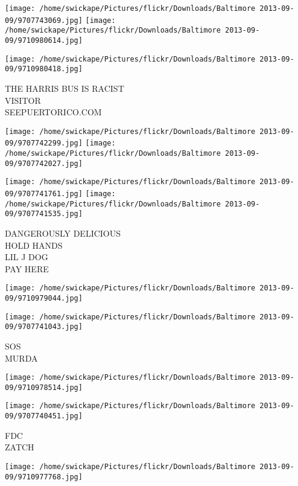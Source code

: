 \documentclass[10pt,letterpaper]{article}
\begin{document}
\texttt{[image: /home/swickape/Pictures/flickr/Downloads/Baltimore 2013-09-09/9707743069.jpg]}
\texttt{[image: /home/swickape/Pictures/flickr/Downloads/Baltimore 2013-09-09/9710980614.jpg]}

\vspace{0.25in}
\texttt{[image: /home/swickape/Pictures/flickr/Downloads/Baltimore 2013-09-09/9710980418.jpg]}

THE HARRIS BUS IS RACIST\\
VISITOR\\
SEEPUERTORICO.COM\\
\pagebreak

\texttt{[image: /home/swickape/Pictures/flickr/Downloads/Baltimore 2013-09-09/9707742299.jpg]}
\texttt{[image: /home/swickape/Pictures/flickr/Downloads/Baltimore 2013-09-09/9707742027.jpg]}

\texttt{[image: /home/swickape/Pictures/flickr/Downloads/Baltimore 2013-09-09/9707741761.jpg]}
\texttt{[image: /home/swickape/Pictures/flickr/Downloads/Baltimore 2013-09-09/9707741535.jpg]}

DANGEROUSLY DELICIOUS\\
HOLD HANDS\\
LIL J DOG\\
PAY HERE\\
\pagebreak

\texttt{[image: /home/swickape/Pictures/flickr/Downloads/Baltimore 2013-09-09/9710979044.jpg]}

\vspace{0.25in}
\texttt{[image: /home/swickape/Pictures/flickr/Downloads/Baltimore 2013-09-09/9707741043.jpg]}

SOS\\
MURDA\\
\pagebreak

\texttt{[image: /home/swickape/Pictures/flickr/Downloads/Baltimore 2013-09-09/9710978514.jpg]}

\vspace{0.25in}
\texttt{[image: /home/swickape/Pictures/flickr/Downloads/Baltimore 2013-09-09/9707740451.jpg]}

FDC\\
ZATCH\\
\pagebreak

\texttt{[image: /home/swickape/Pictures/flickr/Downloads/Baltimore 2013-09-09/9710977768.jpg]}
\end{document}
